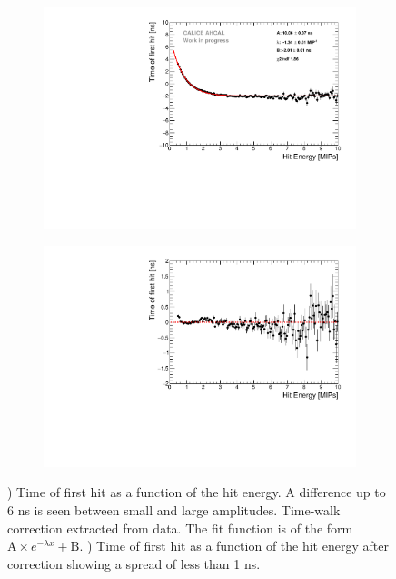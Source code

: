 \begin{figure}[htbp!]
	\begin{subfigure}[t]{0.5\textwidth}
		\centering
		\includegraphics[width=1\textwidth]{../Thesis_Plots/Timing/Muons/Plots/TimeWalkProfile.pdf}
		\caption{}\label{fig:time_walk}
	\end{subfigure}
	\hfill
	\begin{subfigure}[t]{0.5\textwidth}
		\centering
		\includegraphics[width=1\textwidth]{../Thesis_Plots/Timing/Muons/Plots/TimeWalkProfile_Correction.pdf}
		\caption{}\label{fig:time_walk_corr}
	\end{subfigure}
	\caption{) Time of first hit as a function of the hit energy. A difference up to 6 ns is seen between small and large amplitudes. Time-walk correction extracted from data. The fit function is of the form $\text{A} \times e^{-\lambda{}x} + \text{B}$. ) Time of first hit as a function of the hit energy after correction showing a spread of less than 1 ns.}
\end{figure}

